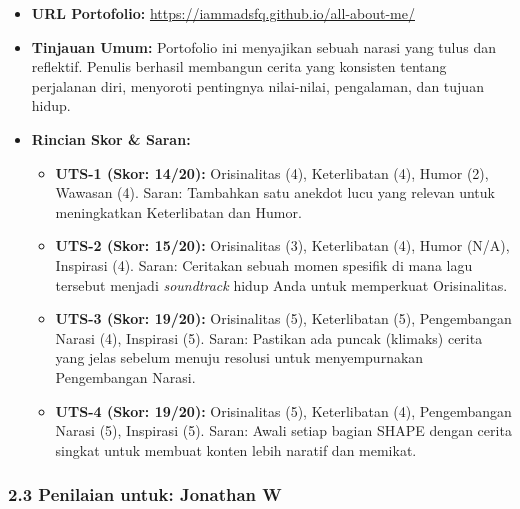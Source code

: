 \documentclass[
  letterpaper,
  DIV=11,
  numbers=noendperiod]{scrreprt}
\providecommand{\tightlist}{%
  \setlength{\itemsep}{0pt}\setlength{\parskip}{0pt}}
\begin{document}
\begin{itemize}
\tightlist
\item
  \textbf{URL Portofolio:}
  \url{https://iammadsfq.github.io/all-about-me/}
\item
  \textbf{Tinjauan Umum:} Portofolio ini menyajikan sebuah narasi yang
  tulus dan reflektif. Penulis berhasil membangun cerita yang konsisten
  tentang perjalanan diri, menyoroti pentingnya nilai-nilai, pengalaman,
  dan tujuan hidup.
\item
  \textbf{Rincian Skor \& Saran:}

  \begin{itemize}
  \tightlist
  \item
    \textbf{UTS-1 (Skor: 14/20):} Orisinalitas (4), Keterlibatan (4),
    Humor (2), Wawasan (4). Saran: Tambahkan satu anekdot lucu yang
    relevan untuk meningkatkan Keterlibatan dan Humor.
  \item
    \textbf{UTS-2 (Skor: 15/20):} Orisinalitas (3), Keterlibatan (4),
    Humor (N/A), Inspirasi (4). Saran: Ceritakan sebuah momen spesifik
    di mana lagu tersebut menjadi \emph{soundtrack} hidup Anda untuk
    memperkuat Orisinalitas.
  \item
    \textbf{UTS-3 (Skor: 19/20):} Orisinalitas (5), Keterlibatan (5),
    Pengembangan Narasi (4), Inspirasi (5). Saran: Pastikan ada puncak
    (klimaks) cerita yang jelas sebelum menuju resolusi untuk
    menyempurnakan Pengembangan Narasi.
  \item
    \textbf{UTS-4 (Skor: 19/20):} Orisinalitas (5), Keterlibatan (4),
    Pengembangan Narasi (5), Inspirasi (5). Saran: Awali setiap bagian
    SHAPE dengan cerita singkat untuk membuat konten lebih naratif dan
    memikat.
  \end{itemize}
\end{itemize}

\subsubsection{2.3 Penilaian untuk: Jonathan
W}\label{penilaian-untuk-jonathan-w}
\end{document}
